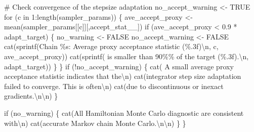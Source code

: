 \documentclass[
  letterpaper,
  DIV=11,
  numbers=noendperiod]{scrartcl}
\newenvironment{Shaded}{\begin{snugshade}}{\end{snugshade}}
\newcommand{\CommentTok}[1]{\textcolor[rgb]{0.37,0.37,0.37}{#1}}
\newcommand{\ConstantTok}[1]{\textcolor[rgb]{0.56,0.35,0.01}{#1}}
\newcommand{\ControlFlowTok}[1]{\textcolor[rgb]{0.00,0.23,0.31}{#1}}
\newcommand{\DecValTok}[1]{\textcolor[rgb]{0.68,0.00,0.00}{#1}}
\newcommand{\FloatTok}[1]{\textcolor[rgb]{0.68,0.00,0.00}{#1}}
\newcommand{\FunctionTok}[1]{\textcolor[rgb]{0.28,0.35,0.67}{#1}}
\newcommand{\NormalTok}[1]{\textcolor[rgb]{0.00,0.23,0.31}{#1}}
\newcommand{\OtherTok}[1]{\textcolor[rgb]{0.00,0.23,0.31}{#1}}
\newcommand{\SpecialCharTok}[1]{\textcolor[rgb]{0.37,0.37,0.37}{#1}}
\newcommand{\StringTok}[1]{\textcolor[rgb]{0.13,0.47,0.30}{#1}}
\begin{document}
\begin{Shaded}
\begin{Highlighting}[]
  \CommentTok{\# Check convergence of the stepsize adaptation}
\NormalTok{  no\_accept\_warning }\OtherTok{\textless{}{-}} \ConstantTok{TRUE}
  \ControlFlowTok{for}\NormalTok{ (c }\ControlFlowTok{in} \DecValTok{1}\SpecialCharTok{:}\FunctionTok{length}\NormalTok{(sampler\_params)) \{}
\NormalTok{    ave\_accept\_proxy }\OtherTok{\textless{}{-}} \FunctionTok{mean}\NormalTok{(sampler\_params[[c]][,}\StringTok{\textquotesingle{}accept\_stat\_\_\textquotesingle{}}\NormalTok{])}
    \ControlFlowTok{if}\NormalTok{ (ave\_accept\_proxy }\SpecialCharTok{\textless{}} \FloatTok{0.9} \SpecialCharTok{*}\NormalTok{ adapt\_target) \{}
\NormalTok{      no\_warning }\OtherTok{\textless{}{-}} \ConstantTok{FALSE}
\NormalTok{      no\_accept\_warning }\OtherTok{\textless{}{-}} \ConstantTok{FALSE}
      \FunctionTok{cat}\NormalTok{(}\FunctionTok{sprintf}\NormalTok{(}\StringTok{\textquotesingle{}Chain \%s: Average proxy acceptance statistic (\%.3f)}\SpecialCharTok{\textbackslash{}n}\StringTok{\textquotesingle{}}\NormalTok{,}
\NormalTok{                   c, ave\_accept\_proxy))}
      \FunctionTok{cat}\NormalTok{(}\FunctionTok{sprintf}\NormalTok{(}\StringTok{\textquotesingle{}          is smaller than 90\%\% of the target (\%.3f).}\SpecialCharTok{\textbackslash{}n}\StringTok{\textquotesingle{}}\NormalTok{,}
\NormalTok{                  adapt\_target))}
\NormalTok{    \}}
\NormalTok{  \}}
  \ControlFlowTok{if}\NormalTok{ (}\SpecialCharTok{!}\NormalTok{no\_accept\_warning) \{}
    \FunctionTok{cat}\NormalTok{(}\StringTok{\textquotesingle{}  A small average proxy acceptance statistic indicates that the}\SpecialCharTok{\textbackslash{}n}\StringTok{\textquotesingle{}}\NormalTok{)}
    \FunctionTok{cat}\NormalTok{(}\StringTok{\textquotesingle{}integrator step size adaptation failed to converge.  This is often}\SpecialCharTok{\textbackslash{}n}\StringTok{\textquotesingle{}}\NormalTok{)}
    \FunctionTok{cat}\NormalTok{(}\StringTok{\textquotesingle{}due to discontinuous or inexact gradients.}\SpecialCharTok{\textbackslash{}n\textbackslash{}n}\StringTok{\textquotesingle{}}\NormalTok{)}
\NormalTok{  \}}

  \ControlFlowTok{if}\NormalTok{ (no\_warning) \{}
    \FunctionTok{cat}\NormalTok{(}\StringTok{\textquotesingle{}All Hamiltonian Monte Carlo diagnostic are consistent with}\SpecialCharTok{\textbackslash{}n}\StringTok{\textquotesingle{}}\NormalTok{)}
    \FunctionTok{cat}\NormalTok{(}\StringTok{\textquotesingle{}accurate Markov chain Monte Carlo.}\SpecialCharTok{\textbackslash{}n\textbackslash{}n}\StringTok{\textquotesingle{}}\NormalTok{)}
\NormalTok{  \}}
\NormalTok{\}}
\end{Highlighting}
\end{Shaded}
\end{document}

